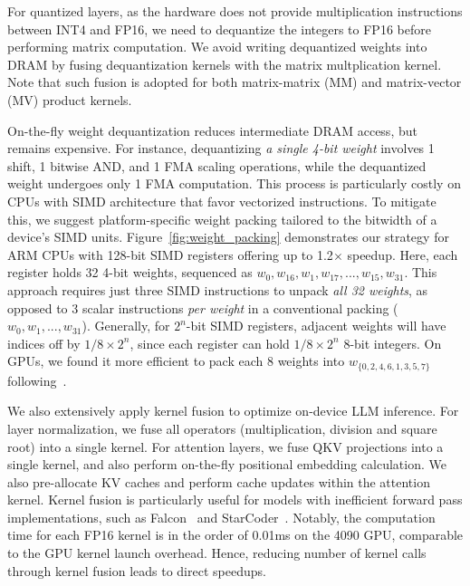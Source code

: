  For quantized layers, as the hardware does not provide multiplication instructions between INT4 and FP16, we need to dequantize the integers to FP16 before performing matrix computation. We avoid writing dequantized weights into DRAM by fusing dequantization kernels with the matrix multplication kernel. Note that such fusion is adopted for both matrix-matrix (MM) and matrix-vector (MV) product kernels. %

 On-the-fly weight dequantization reduces intermediate DRAM access, but remains expensive. For instance, dequantizing \textit{a single 4-bit weight} involves 1 shift, 1 bitwise AND, and 1 FMA scaling operations, while the dequantized weight undergoes only 1 FMA computation. This process is particularly costly on CPUs with SIMD architecture that favor vectorized instructions. To mitigate this, we suggest platform-specific weight packing tailored to the bitwidth of a device's SIMD units. Figure~\ref{fig:weight_packing} demonstrates our strategy for ARM CPUs with 128-bit SIMD registers offering up to 1.2$\times$ speedup. Here, each register holds 32 4-bit weights, sequenced as $w_0, w_{16}, w_{1}, w_{17}, ..., w_{15}, w_{31}$. This approach requires just three SIMD instructions to unpack \textit{all 32 weights}, as opposed to 3 scalar instructions \textit{per weight} in a conventional packing ($w_0, w_1, ..., w_{31}$). Generally, for $2^n$-bit SIMD registers, adjacent weights will have indices off by $1/8\times2^n$, since each register can hold $1/8\times2^n$ 8-bit integers. On GPUs, we found it more efficient to pack each 8 weights into $w_{\{0,2,4,6,1,3,5,7\}}$ following~\cite{kim2022says}. 

 We also extensively apply kernel fusion to optimize on-device LLM inference. For layer normalization, we fuse all operators (\eg multiplication, division and square root) into a single kernel. For attention layers, we fuse QKV projections into a single kernel, and also perform on-the-fly positional embedding calculation. We also pre-allocate KV caches and perform cache updates within the attention kernel. Kernel fusion is particularly useful for models with inefficient forward pass implementations, such as Falcon~\cite{penedo2023refinedweb} and StarCoder~\cite{li2023starcoder}. Notably, the computation time for each FP16 kernel is in the order of 0.01ms on the 4090 GPU, comparable to the GPU kernel launch overhead. Hence, reducing number of kernel calls through kernel fusion leads to direct speedups.

